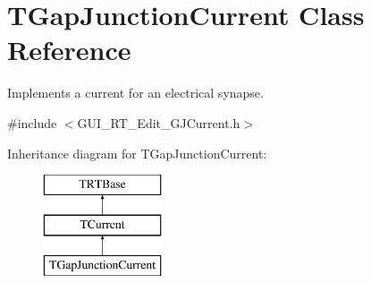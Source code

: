 \hypertarget{class_t_gap_junction_current}{\section{T\+Gap\+Junction\+Current Class Reference}
\label{class_t_gap_junction_current}
}


Implements a current for an electrical synapse.  




{\ttfamily \#include $<$G\+U\+I\+\_\+\+R\+T\+\_\+\+Edit\+\_\+\+G\+J\+Current.\+h$>$}

Inheritance diagram for T\+Gap\+Junction\+Current\+:\begin{figure}[H]
\begin{center}
\leavevmode
\includegraphics[height=3.000000cm]{class_t_gap_junction_current}
\end{center}
\end{figure}
